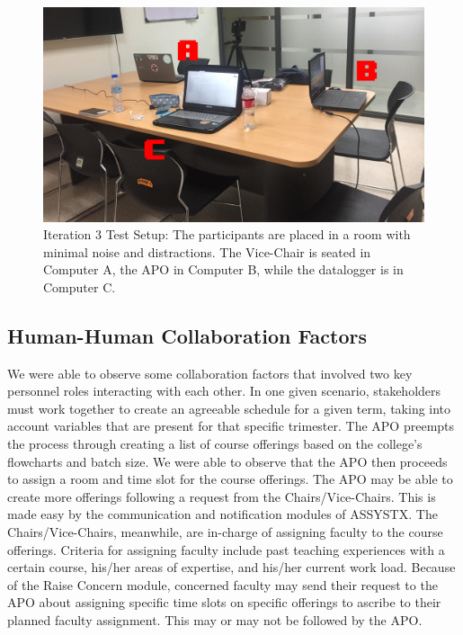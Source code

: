 \begin{figure}[h]
   \centering
   \includegraphics[scale=0.2]{PCSC2019_latex/Tests/test_setup_iteration3.png}
   \caption{Iteration 3 Test Setup: The participants are placed in a room with minimal noise and distractions. The Vice-Chair is seated in Computer A, the APO in Computer B, while the datalogger is in Computer C.}
    \label{fig:itr3_testsetup}
\end{figure}
\subsection{Human-Human Collaboration Factors}
We were able to observe some collaboration factors that involved two key personnel roles interacting with each other. In one given scenario, stakeholders must work together to create an agreeable schedule for a given term, taking into account variables that are present for that specific trimester. The APO preempts the process through creating a list of course offerings based on the college's flowcharts and batch size. We were able to observe that the APO then proceeds to assign a room and time slot for the course offerings. The APO may be able to create more offerings following a request from the Chairs/Vice-Chairs. This is made easy by the communication and notification modules of ASSYSTX. The Chairs/Vice-Chairs, meanwhile, are in-charge of assigning faculty to the course offerings. Criteria for assigning faculty include past teaching experiences with a certain course, his/her areas of expertise, and his/her current work load. Because of the Raise Concern module, concerned faculty may send their request to the APO about assigning specific time slots on specific offerings to ascribe to their planned faculty assignment. This may or may not be followed by the APO. 

